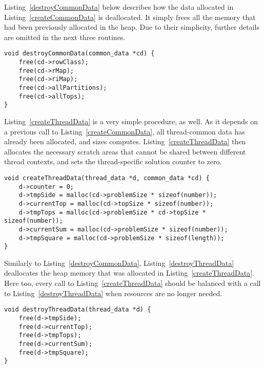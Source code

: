 Listing~\ref{destroyCommonData} below describes how the data allocated in Listing~\ref{createCommonData} is deallocated. It simply frees all the memory that had been previously allocated in the heap. Due to their simplicity, further details are omitted in the next three routines.

\begin{lstlisting}[caption={Deallocating thread-common data.},label={destroyCommonData}]
void destroyCommonData(common_data *cd) {
    free(cd->rowClass);
    free(cd->rMap);
    free(cd->riMap);
    free(cd->allPartitions);
    free(cd->allTops);
}
\end{lstlisting}

Listing~\ref{createThreadData} is a very simple procedure, as well. As it depends on a previous call to Listing~\ref{createCommonData}, all thread-common data has already been allocated, and sizes computes. Listing~\ref{createThreadData} then allocates the necessary scratch areas that cannot be shared between different thread contexts, and sets the thread-specific solution counter to zero.

\begin{lstlisting}[caption={Allocating thread-specific data.},label={createThreadData}]
void createThreadData(thread_data *d, common_data *cd) {
    d->counter = 0;
    d->tmpSide = malloc(cd->problemSize * sizeof(number));
    d->currentTop = malloc(cd->topSize * sizeof(number));
    d->tmpTops = malloc(cd->problemSize * cd->topSize * sizeof(number));
    d->currentSum = malloc(cd->problemSize * sizeof(number));
    d->tmpSquare = malloc(cd->problemSize * sizeof(length));
}
\end{lstlisting}

Similarly to Listing~\ref{destroyCommonData}, Listing~\ref{destroyThreadData} deallocates the heap memory that was allocated in Listing~\ref{createThreadData}. Here too, every call to Listing~\ref{createThreadData} should be balanced with a call to Listing~\ref{destroyThreadData} when resources are no longer needed.

\begin{lstlisting}[caption={Deallocating thread-specific data.},label={destroyThreadData}]
void destroyThreadData(thread_data *d) {
    free(d->tmpSide);
    free(d->currentTop);
    free(d->tmpTops);
    free(d->currentSum);
    free(d->tmpSquare);
}
\end{lstlisting}


